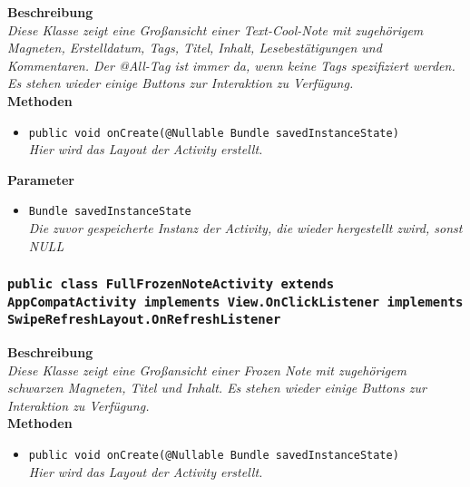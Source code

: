 \documentclass[a4paper]{scrreprt}
\begin{document}
               	\textbf{Beschreibung} \\
      	        \textit{Diese Klasse zeigt eine Großansicht einer Text-Cool-Note mit zugehörigem Magneten, Erstelldatum, Tags, Titel, Inhalt, Lesebestätigungen und Kommentaren. Der @All-Tag ist immer da, wenn keine Tags spezifiziert werden. Es stehen wieder einige Buttons zur Interaktion zu Verfügung.} \\
                
                \textbf{Methoden}
                \begin{itemize}
        		\item\texttt{{public void onCreate(@Nullable Bundle savedInstanceState)}}\\
                \textit{Hier wird das Layout der Activity erstellt.}\\
                \end{itemize}
                
                \textbf{Parameter}
                \begin{itemize}
        		\item\texttt{Bundle savedInstanceState}\\ 
                \textit{Die zuvor gespeicherte Instanz der Activity, die wieder hergestellt zwird, sonst NULL}\\
                \end{itemize} 
                
      	\subsubsection{\texttt{public class FullFrozenNoteActivity extends AppCompatActivity implements View.OnClickListener implements SwipeRefreshLayout.OnRefreshListener}}
               
               	\textbf{Beschreibung} \\
      	        \textit{Diese Klasse zeigt eine Großansicht einer Frozen Note mit zugehörigem schwarzen Magneten, Titel und Inhalt. Es stehen wieder einige Buttons zur Interaktion zu Verfügung.} \\
                
                \textbf{Methoden}
                \begin{itemize}
        		\item\texttt{{public void onCreate(@Nullable Bundle savedInstanceState)}}\\
                \textit{Hier wird das Layout der Activity erstellt.}\\
                \end{itemize}
                
\end{document}
